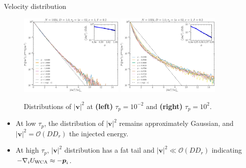 \documentclass{beamer}
\begin{document}
\begin{frame}{Velocity distribution}

\begin{figure}
\centering
\includegraphics[width=0.45\textwidth]{No1024_Fl1000_Vl0000_Tl1000_Rn1000.pv2.eps}
\includegraphics[width=0.45\textwidth]{No1024_Fl1000_Vl0000_Tl1000_Rj1000.pv2.eps}
\caption{Distributions of $|\boldsymbol{v}|^2$ at {\bf (left)} $\tau_p = 10^{-2}$ and {\bf (right)} $\tau_p = 10^2$.}
\end{figure}

\begin{itemize}
  \item At low $\tau_p$, the distribution of $|\boldsymbol{v}|^2$ remains approximately Gaussian, and $|\boldsymbol{v}|^2 = \mathcal{O}(D D_r)$ the injected energy.
  \item At high $\tau_p$, $|\boldsymbol{v}|^2$ distribution has a fat tail and $|\boldsymbol{v}|^2 \ll \mathcal{O}(D D_r)$ indicating $-\nabla_i U_{\rm WCA} \approx -\boldsymbol{p}_i$.
\end{itemize}


\end{frame}
\end{document}
